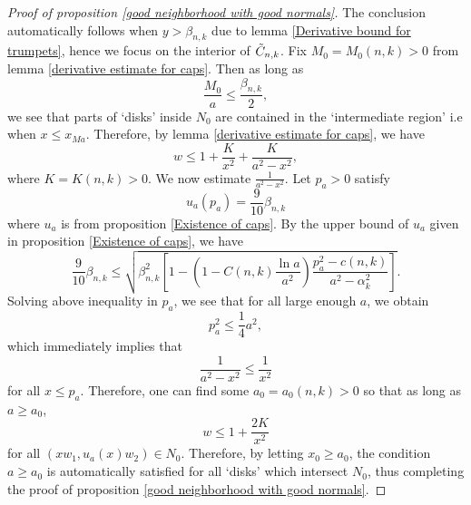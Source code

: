 \documentclass[pdflatex,sn-mathphys-num]{sn-jnl}
\begin{document}
\begin{proof}[Proof of proposition \ref{good neighborhood with good normals}]
The conclusion automatically follows when $y > \beta_{n,k}$ due to lemma \ref{Derivative bound for trumpets}, hence we focus on the interior of $\Tilde{C}_{n,k}$. Fix $M_0 = M_0(n,k) > 0$ from lemma \ref{derivative estimate for caps}. Then as long as $$\frac{M_0}{a} \leq \frac{\beta_{n,k}}{2},$$
we see that parts of `disks' inside $N_0$ are contained in the `intermediate region' i.e when $x \leq x_{Ma}$. Therefore, by lemma \ref{derivative estimate for caps}, we have
$$w \leq 1 + \frac{K}{x^2} + \frac{K}{a^2 - x^2},$$
where $K = K(n,k) > 0$. 
We now estimate $\frac{1}{a^2 - x^2}$. Let $p_{a} > 0$ satisfy $$u_a(p_{a}) = \frac{9}{10}\beta_{n,k}$$
where $u_a$ is from proposition \ref{Existence of caps}. By the upper bound of $u_a$ given in proposition \ref{Existence of caps}, we have
$$\frac{9}{10}\beta_{n,k} \leq \sqrt{\beta_{n,k}^2[1 - (1 - C(n,k)\frac{\ln a}{a^2})\frac{p_a^2 - c(n,k)}{a^2 - \alpha_k^2}]}.$$
Solving above inequality in $p_a$, we see that for all large enough $a$, we obtain 
$$p_a^2 \leq \frac{1}{4}a^2,$$
which immediately implies that
$$\frac{1}{a^2 - x^2}\leq \frac{1}{x^2}$$
for all $x \leq p_a$. Therefore, one can find some $a_0 = a_0(n,k) > 0$ so that as long as $a \geq a_0$, 
$$w \leq 1 + \frac{2K}{x^2}$$
for all $(xw_1, u_a(x)w_2) \in N_0$. Therefore, by letting $x_0 \geq a_0$, the condition $a \geq a_0$ is automatically satisfied for all `disks' which intersect $N_0$, thus completing the proof of proposition \ref{good neighborhood with good normals}.
\end{proof}
\end{document}
